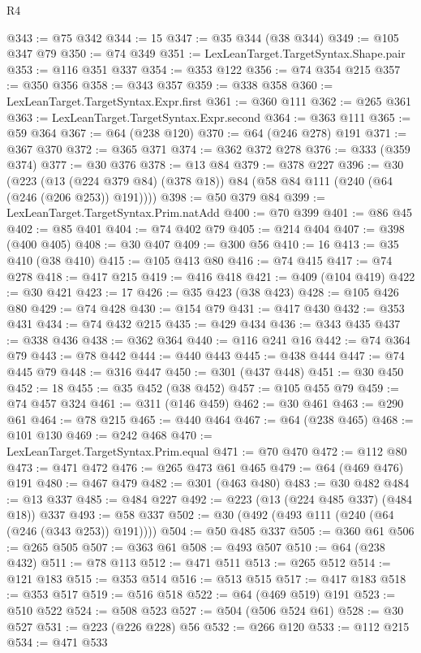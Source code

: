 \begin{lexlean}{R4}
\begin{coremodule}
@343 := @75 @342
@344 := 15
@347 := @35 @344 (@38 @344)
@349 := @105 @347 @79
@350 := @74 @349
@351 := LexLeanTarget.TargetSyntax.Shape.pair
@353 := @116 @351 @337
@354 := @353 @122
@356 := @74 @354 @215
@357 := @350 @356
@358 := @343 @357
@359 := @338 @358
@360 := LexLeanTarget.TargetSyntax.Expr.first
@361 := @360 @111
@362 := @265 @361
@363 := LexLeanTarget.TargetSyntax.Expr.second
@364 := @363 @111
@365 := @59 @364
@367 := @64 (@238 @120)
@370 := @64 (@246 @278) @191
@371 := @367 @370
@372 := @365 @371
@374 := @362 @372 @278
@376 := @333 (@359 @374)
@377 := @30 @376
@378 := @13 @84
@379 := @378 @227
@396 := @30
    (@223 (@13 (@224 @379 @84) (@378 @18)) @84 (@58 @84 @111 (@240 (@64 (@246 (@206 @253)) @191))))
@398 := @50 @379 @84
@399 := LexLeanTarget.TargetSyntax.Prim.natAdd
@400 := @70 @399
@401 := @86 @45
@402 := @85 @401
@404 := @74 @402 @79
@405 := @214 @404
@407 := @398 (@400 @405)
@408 := @30 @407
@409 := @300 @56
@410 := 16
@413 := @35 @410 (@38 @410)
@415 := @105 @413 @80
@416 := @74 @415
@417 := @74 @278
@418 := @417 @215
@419 := @416 @418
@421 := @409 (@104 @419)
@422 := @30 @421
@423 := 17
@426 := @35 @423 (@38 @423)
@428 := @105 @426 @80
@429 := @74 @428
@430 := @154 @79
@431 := @417 @430
@432 := @353 @431
@434 := @74 @432 @215
@435 := @429 @434
@436 := @343 @435
@437 := @338 @436
@438 := @362 @364
@440 := @116 @241 @16
@442 := @74 @364 @79
@443 := @78 @442
@444 := @440 @443
@445 := @438 @444
@447 := @74 @445 @79
@448 := @316 @447
@450 := @301 (@437 @448)
@451 := @30 @450
@452 := 18
@455 := @35 @452 (@38 @452)
@457 := @105 @455 @79
@459 := @74 @457 @324
@461 := @311 (@146 @459)
@462 := @30 @461
@463 := @290 @61
@464 := @78 @215
@465 := @440 @464
@467 := @64 (@238 @465)
@468 := @101 @130
@469 := @242 @468
@470 := LexLeanTarget.TargetSyntax.Prim.equal
@471 := @70 @470
@472 := @112 @80
@473 := @471 @472
@476 := @265 @473 @61 @465
@479 := @64 (@469 @476) @191
@480 := @467 @479
@482 := @301 (@463 @480)
@483 := @30 @482
@484 := @13 @337
@485 := @484 @227
@492 := @223 (@13 (@224 @485 @337) (@484 @18)) @337
@493 := @58 @337
@502 := @30 (@492 (@493 @111 (@240 (@64 (@246 (@343 @253)) @191))))
@504 := @50 @485 @337
@505 := @360 @61
@506 := @265 @505
@507 := @363 @61
@508 := @493 @507
@510 := @64 (@238 @432)
@511 := @78 @113
@512 := @471 @511
@513 := @265 @512
@514 := @121 @183
@515 := @353 @514
@516 := @513 @515
@517 := @417 @183
@518 := @353 @517
@519 := @516 @518
@522 := @64 (@469 @519) @191
@523 := @510 @522
@524 := @508 @523
@527 := @504 (@506 @524 @61)
@528 := @30 @527
@531 := @223 (@226 @228) @56
@532 := @266 @120
@533 := @112 @215
@534 := @471 @533

\end{coremodule}
\end{lexlean}
